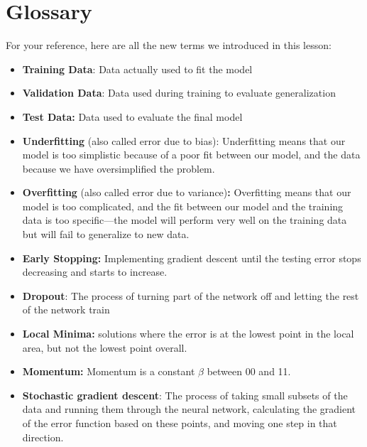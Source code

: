 \section{Glossary}

For your reference, here are all the new terms we introduced in this lesson:

\begin{itemize}
    \item \textbf{Training Data}: Data actually used to fit the model
    \item \textbf{Validation Data}: Data used during training to evaluate generalization
    \item \textbf{Test Data:} Data used to evaluate the final model
    \item \textbf{Underfitting} (also called error due to bias): Underfitting means that our model is too simplistic because of a poor fit between our model, and the data because we have oversimplified the problem.
    \item \textbf{Overfitting} (also called error due to variance)\textbf{:} Overfitting means that our model is too complicated, and the fit between our model and the training data is too specific—the model will perform very well on the training data but will fail to generalize to new data.
    \item \textbf{Early Stopping:} Implementing gradient descent until the testing error stops decreasing and starts to increase.
    \item \textbf{Dropout}: The process of turning part of the network off and letting the rest of the network train
    \item \textbf{Local Minima:} solutions where the error is at the lowest point in the local area, but not the lowest point overall.
    \item \textbf{Momentum:} Momentum is a constant \(\beta\) between 00 and 11.
    \item \textbf{Stochastic gradient descent}: The process of taking small subsets of the data and running them through the neural network, calculating the gradient of the error function based on these points, and moving one step in that direction.
\end{itemize}
